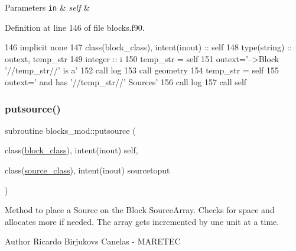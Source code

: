 \begin{DoxyParams}[1]{Parameters}
\mbox{\tt in}  & {\em self} & \\
\hline
\end{DoxyParams}


Definition at line 146 of file blocks.\+f90.


\begin{DoxyCode}
146     \textcolor{keywordtype}{implicit none}
147     \textcolor{keywordtype}{class}(block\_class), \textcolor{keywordtype}{intent(inout)} :: self
148     \textcolor{keywordtype}{type}(string) :: outext, temp\_str
149     \textcolor{keywordtype}{integer} :: i
150     temp\_str = self%
151     outext=\textcolor{stringliteral}{'-->Block '}//temp\_str//\textcolor{stringliteral}{' is a'}
152     \textcolor{keyword}{call }log%
153     \textcolor{keyword}{call }geometry%
154     temp\_str = self%
155     outext=\textcolor{stringliteral}{'      and has '}//temp\_str//\textcolor{stringliteral}{' Sources'}
156     \textcolor{keyword}{call }log%
157     \textcolor{keyword}{call }self%
\end{DoxyCode}
\mbox{\label{namespaceblocks__mod_a5d11f4958d950c7f436c040bc4133ea0}} 
\subsubsection{\texorpdfstring{putsource()}{putsource()}}
{\footnotesize\ttfamily subroutine blocks\+\_\+mod\+::putsource (\begin{DoxyParamCaption}\item[{class(\mbox{\hyperlink{structblocks__mod_1_1block__class}{block\+\_\+class}}), intent(inout)}]{self,  }\item[{class(\mbox{\hyperlink{structsources__mod_1_1source__class}{source\+\_\+class}}), intent(inout)}]{sourcetoput }\end{DoxyParamCaption})\hspace{0.3cm}{\ttfamily [private]}}



Method to place a Source on the Block Source\+Array. Checks for space and allocates more if needed. The array gets incremented by une unit at a time. 

\begin{DoxyAuthor}{Author}
Ricardo Birjukovs Canelas -\/ M\+A\+R\+E\+T\+EC
\end{DoxyAuthor}

